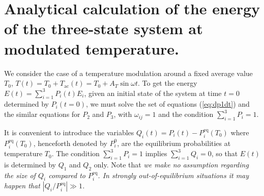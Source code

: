 \documentclass[pre,a4paper,twocolumn,superscriptaddress,%
floatfix]{revtex4}
\newcommand{\tac}{\ensuremath{T_{\mathrm{ac}}}}
\begin{document}
\appendix
\section{Analytical calculation of the energy of the three-state system
  at modulated temperature.}
\label{app:energyt}

We consider the case of a temperature modulation around a fixed average
value $T_0$, $T(t) = T_0 + \tac(t) = T_0 + A_T \sin \omega t$.
To get the energy $E(t) = \sum_{i=1}^3 P_i(t) E_i$, given an initial state of
the system at time $t=0$ determined by $P_i(t=0)$, we must solve the set of
equations (\ref{eq:dp1dt}) and the similar equations for $P_2$ and $P_3$,
with $\omega_{ij} = 1$ and the condition $\sum_{i=1}^3 P_i = 1$.

It is convenient to introduce the variables $Q_i(t) = P_i(t) -
P_i^{\mathrm{eq}}(T_0)$ where $P_i^{\mathrm{eq}}(T_0)$,
henceforth denoted by $P_i^0$, are the equilibrium
probabilities at temperature $T_0$. The condition $\sum_{i=1}^3 P_i = 1$
implies $\sum_{i=1}^3 Q_i = 0$, so that $E(t)$ is determined by $Q_1$ and $Q_2$
only. Note that {\em we make no assumption regarding the size of $Q_i$
  compared to $P_i^{\mathrm{eq}}$. In strongly out-of-equilibrium situations it
  may happen that $|Q_i/P_i^{\mathrm{eq}}| \gg 1$.}
\end{document}
